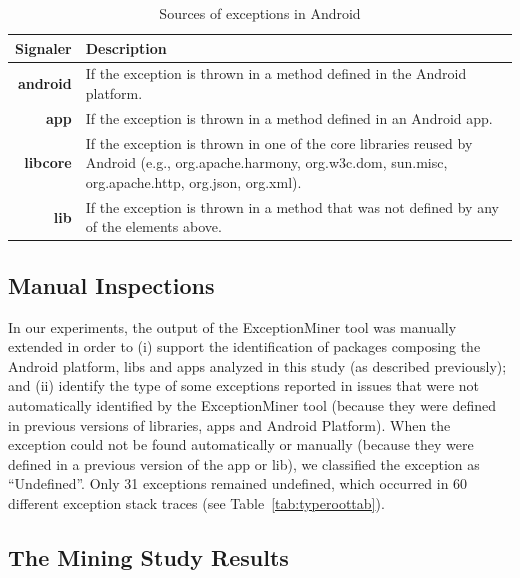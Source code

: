 
\begin{table}
  \centering
  \scriptsize
  \begin{tabular}{rp{29em}}
    \hline
    \bfseries{Signaler} & \bfseries{Description} \\
    \hline
    \bfseries{android} & If the exception is thrown in a method defined in the Android platform.\\
    \bfseries{app}     & If the exception is thrown in a method defined in an Android app.\\
    \bfseries{libcore} & If the exception is thrown in one of the core libraries reused by Android (e.g., org.apache.harmony, org.w3c.dom, sun.misc, org.apache.http, org.json, org.xml). \\
    \bfseries{lib}     & If the exception is thrown in a method that was not defined by any of the elements above.\\
    \hline
  \end{tabular}
  \caption{Sources of exceptions in Android}
  \label{tab:signalers}
\end{table}

\subsection{Manual Inspections}
\label{sec:manual}
In our experiments, the output of the ExceptionMiner tool was manually extended
in order to
(i) support the identification of packages composing the Android platform,
libs and apps analyzed in this study (as described previously); and (ii)
identify the type of some exceptions reported in issues
that were not automatically identified by the ExceptionMiner tool
(because they were defined in previous versions of libraries,
apps and Android Platform). When the exception could not be
found automatically or manually (because they were defined in a previous version
of the app or lib), we classified the exception as ``Undefined''.  Only 31 exceptions
remained undefined, which occurred in 60 different exception stack traces (see Table~\ref{tab:typeroottab}).

\subsection{The Mining Study Results}
\label{sec:result}


